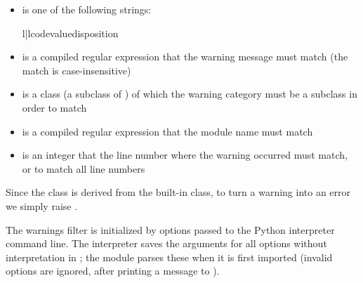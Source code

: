 \begin{itemize}

\item {} is one of the following strings:

    \begin{tableii}{l|l}{code}{value}{disposition}







    \end{tableii}

\item {} is a compiled regular expression that the warning
message must match (the match is case-insensitive)

\item {} is a class (a subclass of ) of
      which the warning category must be a subclass in order to match

\item {} is a compiled regular expression that the module
      name must match

\item {} is an integer that the line number where the
      warning occurred must match, or  to match all line
      numbers

\end{itemize}

Since the  class is derived from the built-in
 class, to turn a warning into an error we simply
raise .

The warnings filter is initialized by  options passed to the
Python interpreter command line.  The interpreter saves the arguments
for all  options without interpretation in
; the  module parses these when
it is first imported (invalid options are ignored, after printing a
message to ).


